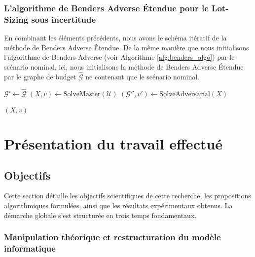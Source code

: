 \documentclass[12pt, a4paper, twoside]{article}
\numberwithin{equation}{section}
\begin{document}
	\subsubsection{L’algorithme de  Benders Adverse Étendue pour le Lot-Sizing sous incertitude }
	
	En combinant les éléments précédents, nous avons le schéma itératif de la méthode de  Benders Adverse Étendue. De la même manière que nous initialisons l'algorithme de Benders Adverse (voir Algorithme \ref{alg:benders_algo}) par le scénario nominal, ici, nous initialisons la méthode de  Benders Adverse Étendue par le graphe de budget $\hat{\mathcal{G}}$ ne contenant que le scénario nominal.

    \begin{algorithm}[H]
        \caption{Extended Adversarial Benders Method}
        \label{alg:benders_algo_etendue}

        $\mathcal{G}' \gets \hat{\mathcal{G}}$\;
        $(X,v) \gets \text{SolveMaster}(\mathcal{U})$\;
        $(\mathcal{G}'',v') \gets \text{SolveAdversarial}(X)$\;
    
        
        \Return $(X,v)$\;
    \end{algorithm}

	\clearpage
	\section{Présentation du travail effectué}
	
	\subsection{Objectifs}
	
	Cette section détaille les objectifs scientifiques de cette recherche, les propositions algorithmiques formulées, ainsi que les résultats expérimentaux obtenus. La démarche globale s'est structurée en trois temps fondamentaux.
	
	\subsubsection{Manipulation théorique et restructuration du modèle informatique}
	
\end{document}
